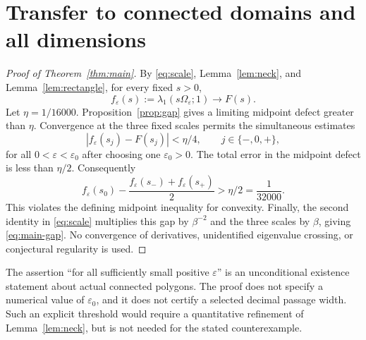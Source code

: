 \documentclass[11pt,a4paper]{article}
\theoremstyle{definition}\newtheorem{definition}[theorem]{Definition}
\theoremstyle{remark}\newtheorem{remark}[theorem]{Remark}
\begin{document}
\section{Transfer to connected domains and all dimensions}
\label{sec:transfer}

\begin{proof}[Proof of Theorem~\ref{thm:main}]
By \eqref{eq:scale}, Lemma~\ref{lem:neck}, and
Lemma~\ref{lem:rectangle}, for every fixed $s>0$,
\begin{equation}\label{eq:pointwise}
 f_\varepsilon(s):=\lambda_1(s\Omega_\varepsilon;1)
 \longrightarrow F(s).
\end{equation}
Let $\eta=1/16000$. Proposition~\ref{prop:gap} gives a limiting
midpoint defect greater than $\eta$. Convergence at the three
fixed scales permits the simultaneous estimates
\[
 |f_\varepsilon(s_j)-F(s_j)|<\eta/4,
 \qquad j\in\{-,0,+\},
\]
for all $0<\varepsilon<\varepsilon_0$ after choosing one
$\varepsilon_0>0$. The total error in the midpoint defect is
less than $\eta/2$. Consequently
\begin{equation}\label{eq:planar-gap}
 f_\varepsilon(s_0)-\frac{f_\varepsilon(s_-)+f_\varepsilon(s_+)}2
 >\eta/2=\frac1{32000}.
\end{equation}
This violates the defining midpoint inequality for convexity.
Finally, the second identity in \eqref{eq:scale} multiplies this
gap by $\beta^{-2}$ and the three scales by $\beta$, giving
\eqref{eq:main-gap}. No convergence of derivatives, unidentified
eigenvalue crossing, or conjectural regularity is used.
\end{proof}

The assertion ``for all sufficiently small positive
$\varepsilon$'' is an unconditional existence statement about
actual connected polygons. The proof does not specify a numerical
value of $\varepsilon_0$, and it does not certify a selected
decimal passage width. Such an explicit threshold would require
a quantitative refinement of Lemma~\ref{lem:neck}, but is not
needed for the stated counterexample.
\end{document}
